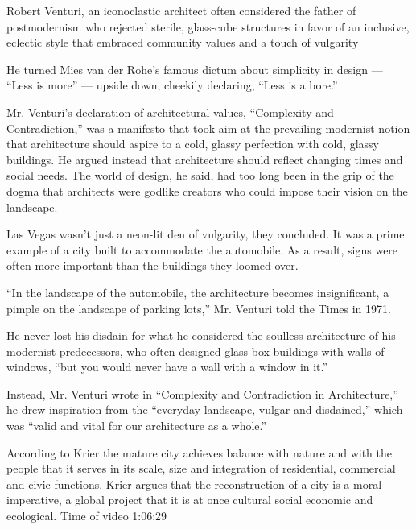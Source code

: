     Robert Venturi, an iconoclastic architect often considered the father of postmodernism who rejected sterile, glass-cube structures in favor of an inclusive, eclectic style that embraced community values and a touch of vulgarity\cite{Schudel2018}

    He turned Mies van der Rohe’s famous dictum about simplicity in design — “Less is more” — upside down, cheekily declaring, “Less is a bore.”\cite{Schudel2018}

    Mr. Venturi’s declaration of architectural values, “Complexity and Contradiction,” was a manifesto that took aim at the prevailing modernist notion that architecture should aspire to a cold, glassy perfection with cold, glassy buildings.
    He argued instead that architecture should reflect changing times and social needs.
    The world of design, he said, had too long been in the grip of the dogma that architects were godlike creators who could impose their vision on the landscape.\cite{Schudel2018}

     Las Vegas wasn’t just a neon-lit den of vulgarity, they concluded.
     It was a prime example of a city built to accommodate the automobile.
     As a result, signs were often more important than the buildings they loomed over.\cite{Schudel2018}

    “In the landscape of the automobile, the architecture becomes insignificant, a pimple on the landscape of parking lots,” Mr. Venturi told the Times in 1971.\cite{Schudel2018}

    He never lost his disdain for what he considered the soulless architecture of his modernist predecessors, who often designed glass-box buildings with walls of windows, “but you would never have a wall with a window in it.”\cite{Schudel2018}

    Instead, Mr. Venturi wrote in “Complexity and Contradiction in Architecture,” he drew inspiration from the “everyday landscape, vulgar and disdained,” which was “valid and vital for our architecture as a whole.”\cite{Schudel2018}


    According to Krier the mature city achieves balance with nature and with the people that it serves in its scale, size and integration of residential, commercial and civic functions.
    Krier argues that the reconstruction of a city is a moral imperative, a global project that it is at once cultural social economic and ecological. Time of video 1:06:29\cite{Economakis2023}


